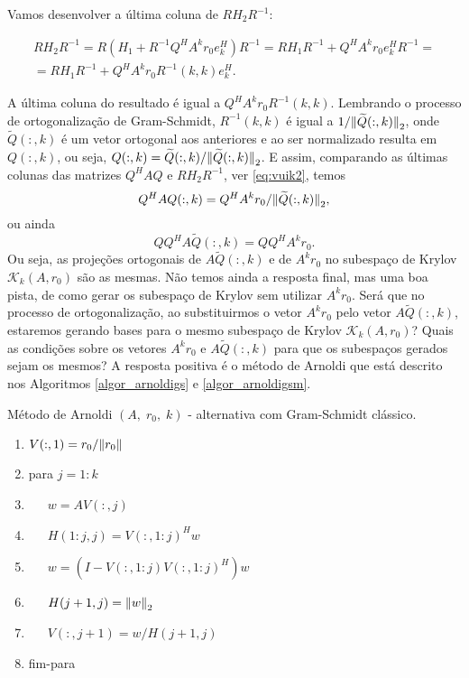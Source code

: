 {
     Vamos desenvolver a  última  coluna de $RH_2R^{-1}$:
   
     \begin{multline*}
          RH_2R^{-1}=R(H_1+R^{-1}Q^HA^kr_0e_k^H)R^{-1}=RH_1R^{-1}+Q^HA^kr_0e_k^HR^{-1}=\\
          =RH_1R^{-1}+Q^HA^kr_0R^{-1}(k,k)e_k^H.
          \end{multline*}

     A última coluna do resultado é  igual a $Q^HA^kr_0R^{-1}(k,k)$. Lembrando o processo de ortogonalização de Gram-Schmidt, $R^{-1}(k,k)$ é igual a $1/{\Vert \widetilde{Q}(:,k)\Vert}_2$, onde $\widetilde{Q}(:,k)$ é um vetor ortogonal aos anteriores  e ao ser normalizado resulta em ${Q}(:,k)$, ou seja, ${Q}(:,k)=\widetilde{Q}(:,k)/{\Vert \widetilde{Q}(:,k)\Vert}_2$. E assim, comparando as  últimas colunas das matrizes $Q^HAQ$ e $RH_2R^{-1}$, ver \eqref{eq:vuik2}, temos
     \[
     Q^HA{Q}(:,k)=Q^HA^kr_0/{\Vert \widetilde{Q}(:,k)\Vert}_2,
     \]
     ou ainda
     \[QQ^HA\widetilde{Q}(:,k)=QQ^HA^kr_0.\]
     Ou seja, as projeções ortogonais de $A\widetilde{Q}(:,k)$ e de $A^kr_0$ no subespaço de Krylov $\mathcal{K}_k(A,r_0)$ são  as mesmas. Não temos ainda a resposta final, mas uma boa pista, de como gerar os subespaço de Krylov sem utilizar $A^kr_0$. Será que no processo de ortogonalização, ao substituirmos  o vetor $A^kr_0$ pelo vetor $A\widetilde{Q}(:,k)$, estaremos gerando bases para o mesmo subespaço de Krylov $\mathcal{K}_k(A,r_0)$? Quais as condições sobre os vetores $A^kr_0$ e $A\widetilde{Q}(:,k)$ para que os subespaços gerados sejam os mesmos? A resposta positiva é o método de Arnoldi que está descrito nos Algoritmos \ref{algor_arnoldigs} e \ref{algor_arnoldigsm}.
}
     \begin{algor}[htb]
\caption{ Método  de Arnoldi $(A,\;r_0,\;k)$ - alternativa com Gram-Schmidt clássico.} \label{algor_arnoldigs}

{%
\begin{enumerate}
\renewcommand{\labelenumi}{\theenumi:}
\setlength{\itemsep}{.01cm}
\item $V(:,1)=r_0/{\Vert r_0\Vert}$
\item para $j=1:k$
\item~~~$w=AV(:,j)$
\item~~~$H(1:j,j)=V(:,1:j)^Hw$
\item~~~$w=(I-V(:,1:j)V(:,1:j)^H)w$
\item~~~$H(j+1,j)={\Vert w\Vert}_2$
\item~~~$V(:,j+1)=w/H(j+1,j)$
\item fim-para
\renewcommand{\labelenumi}{\theenumi.}
\end{enumerate}
}
\end{algor}
